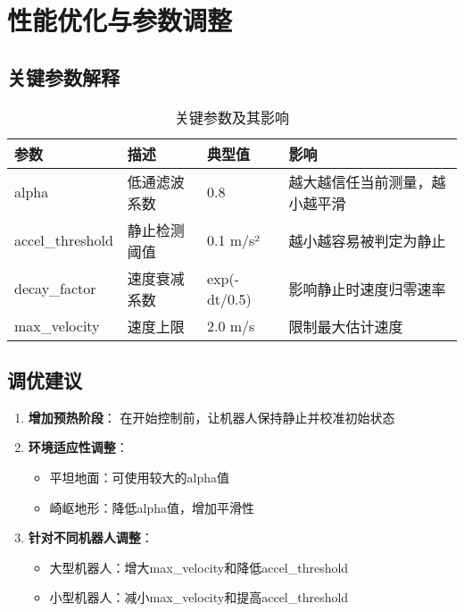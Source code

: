 \documentclass[12pt,a4paper]{article}
\begin{document}
\section{性能优化与参数调整}

\subsection{关键参数解释}

\begin{table}[htbp]
\centering
\begin{tabular}{@{}llll@{}}
\toprule
参数 & 描述 & 典型值 & 影响 \\
\midrule
alpha & 低通滤波系数 & 0.8 & 越大越信任当前测量，越小越平滑 \\
accel\_threshold & 静止检测阈值 & 0.1 m/s² & 越小越容易被判定为静止 \\
decay\_factor & 速度衰减系数 & exp(-dt/0.5) & 影响静止时速度归零速率 \\
max\_velocity & 速度上限 & 2.0 m/s & 限制最大估计速度 \\
\bottomrule
\end{tabular}
\caption{关键参数及其影响}
\end{table}

\subsection{调优建议}

\begin{enumerate}
    \item \textbf{增加预热阶段}：
    在开始控制前，让机器人保持静止并校准初始状态

    \item \textbf{环境适应性调整}：
    \begin{itemize}
        \item 平坦地面：可使用较大的alpha值
        \item 崎岖地形：降低alpha值，增加平滑性
    \end{itemize}
    
    \item \textbf{针对不同机器人调整}：
    \begin{itemize}
        \item 大型机器人：增大max\_velocity和降低accel\_threshold
        \item 小型机器人：减小max\_velocity和提高accel\_threshold
    \end{itemize}
\end{enumerate}
\end{document}
